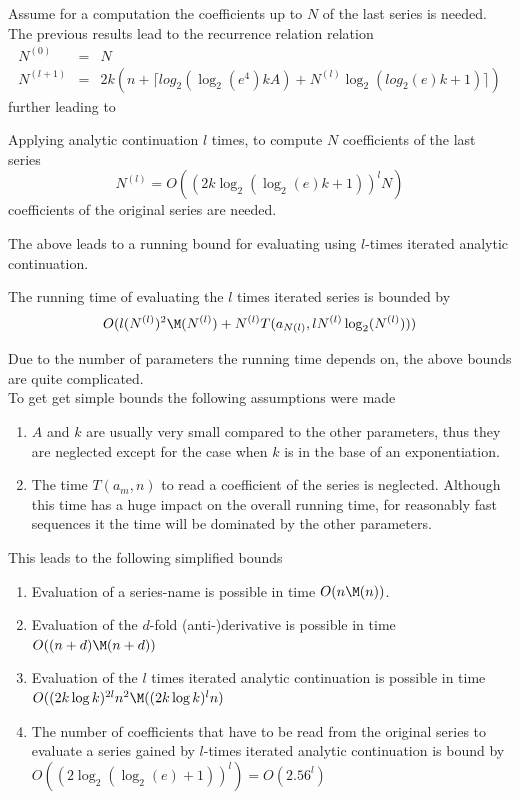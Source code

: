 		Assume for a computation the coefficients up to $N$ of the last series is needed. 
		The previous results lead to the recurrence relation
		relation 
		\begin{eqnarray*}
			N^{(0)} &=& N \\
			N^{(l+1)} &=& 2k\left( n+\lceil log_2(\log_2 (e^4) kA) + N^{(l)} \log_2(log_2(e)k+1)\rceil \right)
		\end{eqnarray*}
		further leading to
		\begin{theorem}
			Applying analytic continuation $l$ times, to compute $N$ coefficients of the last series 
			\begin{equation}
				N^{(l)} = O((2k \log_2 (\log_2 (e)k +1))^lN) 
			\end{equation}
			coefficients of the original series are needed.
		\end{theorem}
		The above leads to a running bound for evaluating using $l$-times iterated analytic continuation.
		\begin{theorem}
			The running time of evaluating the $l$ times iterated series is bounded by
			\begin{equation}
				 O(l(N^{(l)})^2\M(N^{(l)})+N^{(l)}T(a_{N(l)}, l N^{(l)}\log_2(N^{(l)}))) 
			\end{equation}
		\end{theorem}
		Due to the number of parameters the running time depends on, the above bounds are quite complicated.\\
		To get get simple bounds the following assumptions were made
		\begin{enumerate}
			\item $A$ and $k$ are usually very small compared to the other parameters, 
			thus they are neglected except for the case when $k$ is in the base of an exponentiation.
			\item The time $T(a_m, n)$ to read a coefficient of the series is neglected. 
			Although this time has a huge impact on the overall running time, for reasonably fast sequences it 
			the time will be dominated by the other parameters.
		\end{enumerate}
		This leads to the following simplified bounds
		\begin{enumerate}
			\item Evaluation of a series-name is possible in time $O(n\M(n))$.
			\item Evaluation of the $d$-fold (anti-)derivative is possible in time $O((n+d)\M(n+d))$
			\item Evaluation of the $l$ times iterated analytic continuation is possible in time $O((2k \log k)^{2l}n^2\M((2k\log k)^ln)$
			\item The number of coefficients that have to be read from the original series to evaluate a series gained by 
			$l$-times iterated analytic continuation is bound by $O((2\log_2(\log_2(e)+1))^l) = O(2.56^l)$
		\end{enumerate}

